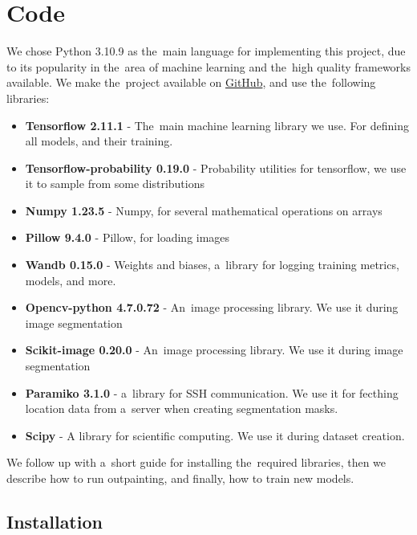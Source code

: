 \chapter{Code} \label{code}

We chose Python 3.10.9 as the~main language for implementing this project, due to its popularity in the~area of machine learning and the~high quality frameworks available. We make the~project available on \textcolor{red}{\href{https://github.com/Matezzzz/Image_outpainting}{GitHub}}, and use the~following libraries:

\begin{itemize}
    \item \textbf{Tensorflow 2.11.1} \citep{tensorflow} - The~main machine learning library we use. For defining all models, and their training.
    \item \textbf{Tensorflow-probability 0.19.0} \citep{tensorflow_probability} - Probability utilities for tensorflow, we use it to sample from some distributions
    \item \textbf{Numpy 1.23.5} \citep{numpy} - Numpy, for several mathematical operations on arrays
    \item \textbf{Pillow 9.4.0} \citep{pillow} - Pillow, for loading images
    \item \textbf{Wandb 0.15.0} \citep{wandb} - Weights and biases, a~library for logging training metrics, models, and more.
    \item \textbf{Opencv-python 4.7.0.72} \citep{opencv_python} - An~image processing library. We use it during image segmentation
    \item \textbf{Scikit-image 0.20.0} \citep{scikit_image} - An~image processing library. We use it during image segmentation
    \item \textbf{Paramiko 3.1.0} \citep{paramiko} - a~library for SSH communication. We use it for fecthing location data from a~server when creating segmentation masks.
    \item \textbf{Scipy} \citep{scipy} - A library for scientific computing. We use it during dataset creation.
\end{itemize}


We follow up with a~short guide for installing the~required libraries, then we describe how to run outpainting, and finally, how to train new models.

\section{Installation}

